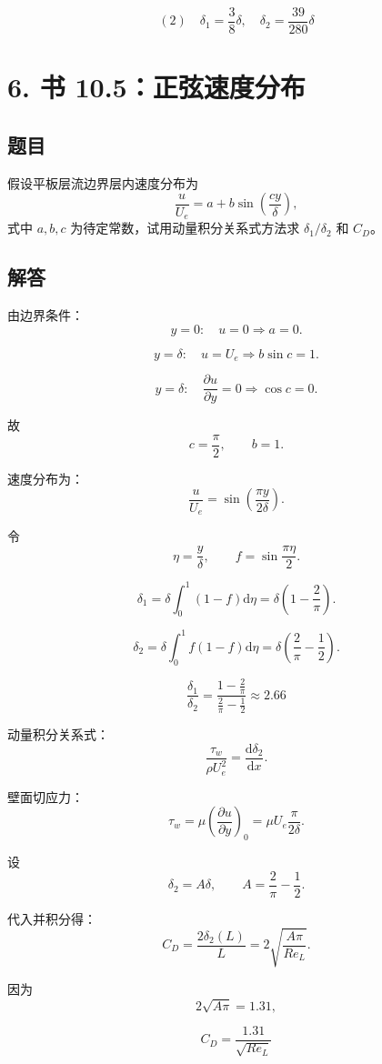 \documentclass[11pt,a4paper]{ctexart}
\newcommand{\dd}{\mathrm{d}}
\begin{document}
\[
\boxed{(2)\quad \delta_1=\frac38\delta,\quad \delta_2=\frac{39}{280}\delta}
\]

\section*{6. 书 10.5：正弦速度分布}

\subsection*{题目}

假设平板层流边界层内速度分布为
\[
\frac{u}{U_e}=a+b\sin\left(\frac{cy}{\delta}\right),
\]
式中 \(a,b,c\) 为待定常数，试用动量积分关系式方法求 \(\delta_1/\delta_2\) 和 \(C_D\)。

\subsection*{解答}

由边界条件：
\[
y=0:\quad u=0\Rightarrow a=0.
\]

\[
y=\delta:\quad u=U_e\Rightarrow b\sin c=1.
\]

\[
y=\delta:\quad \frac{\partial u}{\partial y}=0
\Rightarrow \cos c=0.
\]

故
\[
c=\frac{\pi}{2},\qquad b=1.
\]

速度分布为：
\[
\frac{u}{U_e}=\sin\left(\frac{\pi y}{2\delta}\right).
\]

令
\[
\eta=\frac{y}{\delta},\qquad f=\sin\frac{\pi\eta}{2}.
\]

\[
\delta_1=\delta\int_0^1(1-f)\dd\eta
=\delta\left(1-\frac{2}{\pi}\right).
\]

\[
\delta_2=\delta\int_0^1f(1-f)\dd\eta
=\delta\left(\frac{2}{\pi}-\frac12\right).
\]

\[
\boxed{\frac{\delta_1}{\delta_2}
=\frac{1-\frac{2}{\pi}}{\frac{2}{\pi}-\frac12}
\approx2.66}
\]

动量积分关系式：
\[
\frac{\tau_w}{\rho U_e^2}=\frac{\dd\delta_2}{\dd x}.
\]

壁面切应力：
\[
\tau_w=\mu\left(\frac{\partial u}{\partial y}\right)_0
=\mu U_e\frac{\pi}{2\delta}.
\]

设
\[
\delta_2=A\delta,\qquad A=\frac{2}{\pi}-\frac12.
\]

代入并积分得：
\[
C_D=\frac{2\delta_2(L)}{L}
=2\sqrt{\frac{A\pi}{Re_L}}.
\]

因为
\[
2\sqrt{A\pi}=1.31,
\]

\[
\boxed{C_D=\frac{1.31}{\sqrt{Re_L}}}
\]
\end{document}
